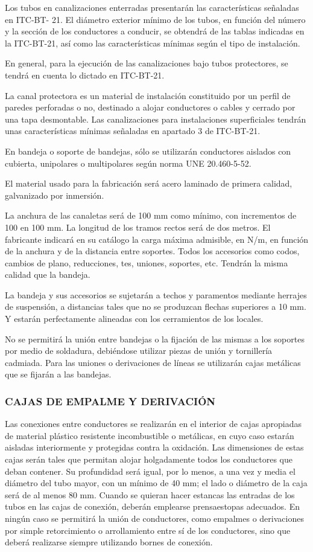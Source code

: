 \documentclass{article}
\begin{document}
Los tubos en canalizaciones enterradas presentarán las características señaladas en ITC-BT-
21. El diámetro exterior mínimo de los tubos, en función del número y la sección de los
conductores a conducir, se obtendrá de las tablas indicadas en la ITC-BT-21, así como las
características mínimas según el tipo de instalación.

En general, para la ejecución de las canalizaciones bajo tubos protectores, se tendrá en cuenta
lo dictado en ITC-BT-21.

La canal protectora es un material de instalación constituido por un perfil de paredes
perforadas o no, destinado a alojar conductores o cables y cerrado por una tapa desmontable.
Las canalizaciones para instalaciones superficiales tendrán unas características mínimas
señaladas en apartado 3 de ITC-BT-21.

En bandeja o soporte de bandejas, sólo se utilizarán conductores aislados con cubierta,
unipolares o multipolares según norma UNE 20.460-5-52.

El material usado para la fabricación será acero laminado de primera calidad, galvanizado por
inmersión.

La anchura de las canaletas será de 100 mm como mínimo, con incrementos de 100 en 100 mm.
La longitud de los tramos rectos será de dos metros. El fabricante indicará en su catálogo la
carga máxima admisible, en N/m, en función de la anchura y de la distancia entre soportes.
Todos los accesorios como codos, cambios de plano, reducciones, tes, uniones, soportes, etc.
Tendrán la misma calidad que la bandeja.

La bandeja y sus accesorios se sujetarán a techos y paramentos mediante herrajes de
suspensión, a distancias tales que no se produzcan flechas superiores a 10 mm. Y estarán
perfectamente alineadas con los cerramientos de los locales.

No se permitirá la unión entre bandejas o la fijación de las mismas a los soportes por medio de
soldadura, debiéndose utilizar piezas de unión y tornillería cadmiada. Para las uniones o
derivaciones de líneas se utilizarán cajas metálicas que se fijarán a las bandejas.


\subsubsection{CAJAS DE EMPALME Y DERIVACIÓN}
Las conexiones entre conductores se realizarán en el interior de cajas apropiadas de material
plástico resistente incombustible o metálicas, en cuyo caso estarán aisladas interiormente y
protegidas contra la oxidación. Las dimensiones de estas cajas serán tales que permitan alojar
holgadamente todos los conductores que deban contener. Su profundidad será igual, por lo
menos, a una vez y media el diámetro del tubo mayor, con un mínimo de 40 mm; el lado o
diámetro de la caja será de al menos 80 mm. Cuando se quieran hacer estancas las entradas de
los tubos en las cajas de conexión, deberán emplearse prensaestopas adecuados. En ningún
caso se permitirá la unión de conductores, como empalmes o derivaciones por simple
retorcimiento o arrollamiento entre sí de los conductores, sino que deberá realizarse siempre
utilizando bornes de conexión.
\end{document}
